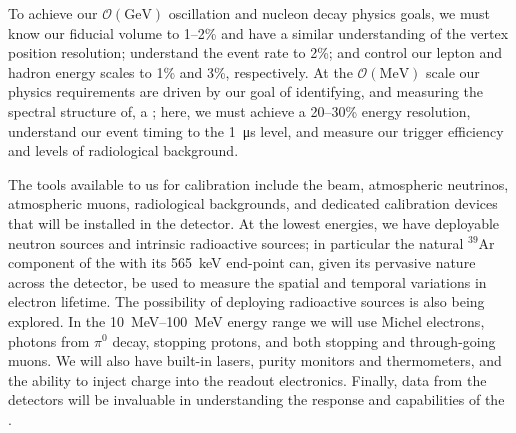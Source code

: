 To achieve our $\mathcal{O}(\si{\giga\electronvolt})$ oscillation and nucleon decay physics goals, we must know our fiducial volume to 1--2\% and have a similar understanding of the vertex position resolution; understand the \nue event rate to 2\%; and control our lepton and hadron energy scales to 1\% and 3\%, respectively. At the $\mathcal{O}(\si{\mega\electronvolt})$ scale our physics requirements are driven by our goal of identifying, and measuring the spectral structure of, a ; here, we must achieve a 20--30\% energy resolution, understand our event timing to the \SI{1}{\micro\second} level, and measure our trigger efficiency and levels of radiological background. %

The tools available to us for calibration include the  beam, atmospheric neutrinos, atmospheric muons, radiological backgrounds, and dedicated calibration devices that will be installed in the detector. At the lowest energies, we have deployable neutron sources and intrinsic radioactive sources; in particular the natural $^{39}$Ar component of the  with its \SI{565}{\kilo\electronvolt} end-point can, given its pervasive nature across the detector, be used to measure the spatial and temporal variations in electron lifetime. The possibility of deploying radioactive sources is also being explored. In the \SIrange{10}{100}{\mega\electronvolt} energy range we will use Michel electrons, photons from $\pi^{0}$ decay, stopping protons, and both stopping and through-going muons. We will also have built-in lasers, purity monitors and thermometers, and the ability to inject charge into the readout electronics. Finally, data from the  detectors will be invaluable in understanding the response and  capabilities of the .


